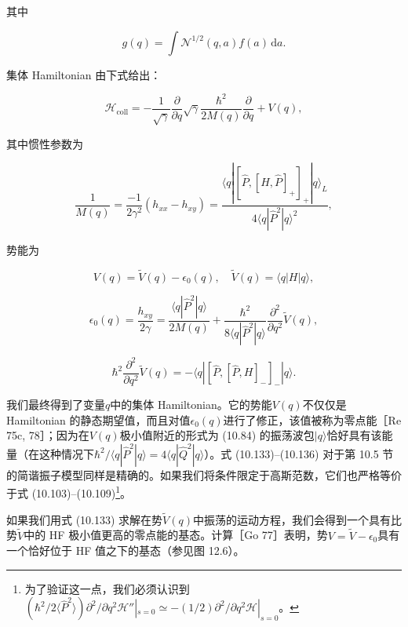 其中

\begin{equation}
g(q)=\int\mathscr{N}^{1/2}(q,a)f(a)\,\mathrm{d}a.\label{eq:10.132}
\end{equation}

集体 Hamiltonian 由下式给出：

\begin{equation}
\mathscr{H}_{\mathrm{coll}}=-\frac{1}{\sqrt{\gamma}}\frac{\partial}{\partial q}\sqrt{\gamma}\frac{\hbar^{2}}{2M(q)}\frac{\partial}{\partial q}+V(q),\label{eq:10.133}
\end{equation}

其中惯性参数为

\begin{equation}
\frac{1}{M(q)}=\frac{-1}{2\gamma^{2}}(h_{xx}-h_{xy})=\frac{\langle q|[\hat{P},[H,\hat{P}]_{+}]_{+}|q\rangle_{L}}{4\langle q|\hat{P}^{2}|q\rangle^{2}},\label{eq:10.134}
\end{equation}

势能为

\begin{equation}
V(q)=\tilde{V}(q)-\epsilon_{0}(q),\quad\tilde{V}(q)=\langle q|H|q\rangle,\label{eq:10.135}
\end{equation}

\begin{equation}
\epsilon_{0}(q)=\frac{h_{xy}}{2\gamma}=\frac{\langle q|\hat{P}^{2}|q\rangle}{2M(q)}+\frac{\hbar^{2}}{8\langle q|\hat{P}^{2}|q\rangle}\frac{\partial^{2}}{\partial q^{2}}\tilde{V}(q),\label{eq:10.136}
\end{equation}

\[
\hbar^{2}\frac{\partial^{2}}{\partial q^{2}}\tilde{V}(q)=-\langle q|[\hat{P},[\hat{P},H]_{-}]_{-}|q\rangle.
\]

我们最终得到了变量$q$中的集体 Hamiltonian。它的势能$V(q)$不仅仅是 Hamiltonian 的静态期望值，而且对值$\epsilon_{0}(q)$进行了修正，该值被称为零点能［Re
75c, 78］；因为在$V(q)$极小值附近的形式为 (10.84) 的振荡波包$|q\rangle$恰好具有该能量（在这种情况下$\hbar^{2}/\langle q|\hat{P}^{2}|q\rangle=4\langle q|\hat{Q}^{2}|q\rangle$）。式
(10.133)–(10.136) 对于第 10.5 节的简谐振子模型同样是精确的。如果我们将条件限定于高斯范数，它们也严格等价于式
(10.103)–(10.109)\footnote{为了验证这一点，我们必须认识到$(\hbar^{2}/2\langle\hat{P}^{2}\rangle)\partial^{2}/\partial q^{2}\mathscr{H}''|_{s=0}\simeq-(1/2)\partial^{2}/\partial q^{2}\mathscr{H}|_{s=0}$。}。

如果我们用式 (10.133) 求解在势$\tilde{V}(q)$中振荡的运动方程，我们会得到一个具有比势$\tilde{V}$中的
HF 极小值更高的零点能的基态。计算［Go 77］表明，势$V=\tilde{V}-\epsilon_{0}$具有一个恰好位于 HF
值之下的基态（参见图 12.6）。

